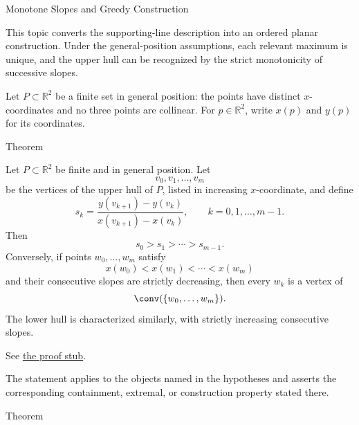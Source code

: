 \begin{topicbox}{Monotone Slopes and Greedy Construction}
\begin{exposition}
This topic converts the supporting-line description into an ordered planar
construction. Under the general-position assumptions, each relevant maximum is
unique, and the upper hull can be recognized by the strict monotonicity of
successive slopes.
\end{exposition}

\begin{assumption}
\label{ass:computational-geometry-general-position}
Let \(P \subset \mathbb{R}^2\) be a finite set in general position: the points
have distinct \(x\)-coordinates and no three points are collinear. For
\(p \in \mathbb{R}^2\), write \(x(p)\) and \(y(p)\) for its coordinates.
\end{assumption}

\begin{theorembox}{Theorem}
\begin{theorem}
\label{thm:computational-geometry-monotone-slope-upper-hull}
Let \(P\subset\mathbb{R}^2\) be finite and in general position. Let
\[
  v_0,v_1,\dots,v_m
\]
be the vertices of the upper hull of \(P\), listed in increasing
\(x\)-coordinate, and define
\[
  s_k
  =
  \frac{y(v_{k+1})-y(v_k)}{x(v_{k+1})-x(v_k)},
  \qquad
  k=0,1,\dots,m-1.
\]
Then
\[
  s_0>s_1>\cdots>s_{m-1}.
\]
Conversely, if points \(w_0,\dots,w_m\) satisfy
\[
  x(w_0)<x(w_1)<\cdots<x(w_m)
\]
and their consecutive slopes are strictly decreasing, then every \(w_k\) is a
vertex of
\[
  \conv(\{w_0,\dots,w_m\}).
\]
The lower hull is characterized similarly, with strictly increasing consecutive
slopes.
\end{theorem}
\end{theorembox}\begin{remark*}[Proof]
See
\hyperref[prf:computational-geometry-monotone-slope-upper-hull]{the proof stub}.
\end{remark*}

\begin{remark*}
The statement applies to the objects named in the hypotheses and asserts the
corresponding containment, extremal, or construction property stated there.
\end{remark*}

\begin{theorembox}{Theorem}


\end{theorembox}
\end{topicbox}
